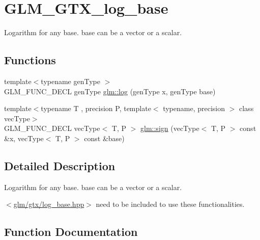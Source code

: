 \hypertarget{group__gtx__log__base}{}\section{G\+L\+M\+\_\+\+G\+T\+X\+\_\+log\+\_\+base}
\label{group__gtx__log__base}


Logarithm for any base. base can be a vector or a scalar.  


\subsection*{Functions}
\begin{DoxyCompactItemize}
\item 
{\footnotesize template$<$typename gen\+Type $>$ }\\G\+L\+M\+\_\+\+F\+U\+N\+C\+\_\+\+D\+E\+C\+L gen\+Type \hyperlink{group__gtx__log__base_ga3e5bcabee78a977e3d7d1bf352b9ea9f}{glm\+::log} (gen\+Type x, gen\+Type base)
\item 
{\footnotesize template$<$typename T , precision P, template$<$ typename, precision $>$ class vec\+Type$>$ }\\G\+L\+M\+\_\+\+F\+U\+N\+C\+\_\+\+D\+E\+C\+L vec\+Type$<$ T, P $>$ \hyperlink{group__gtx__log__base_ga1842004a127a9f3573764362ff639191}{glm\+::sign} (vec\+Type$<$ T, P $>$ const \&x, vec\+Type$<$ T, P $>$ const \&base)
\end{DoxyCompactItemize}


\subsection{Detailed Description}
Logarithm for any base. base can be a vector or a scalar. 

$<$\hyperlink{log__base_8hpp}{glm/gtx/log\+\_\+base.\+hpp}$>$ need to be included to use these functionalities. 

\subsection{Function Documentation}
\hypertarget{group__gtx__log__base_ga3e5bcabee78a977e3d7d1bf352b9ea9f}{}
